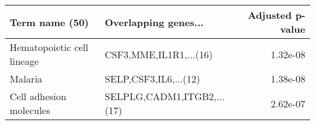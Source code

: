\begin{tabular}{llr}
\toprule
            Term name (50) &       Overlapping genes... &  Adjusted p-value \\
\midrule
Hematopoietic cell lineage &     CSF3,MME,IL1R1,...(16) &          1.32e-08 \\
                   Malaria &      SELP,CSF3,IL6,...(12) &          1.38e-08 \\
   Cell adhesion molecules & SELPLG,CADM1,ITGB2,...(17) &          2.62e-07 \\
\bottomrule
\end{tabular}
